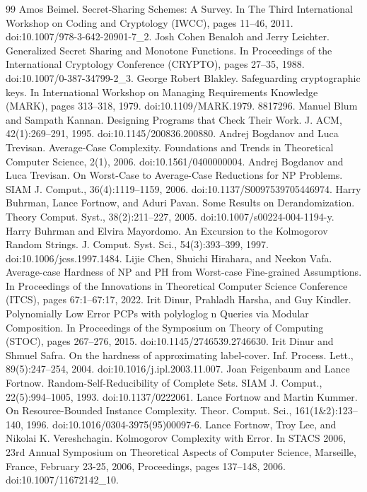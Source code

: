 \documentclass[10pt,a4paper]{article}
\begin{document}
\begin{thebibliography}{99}
 Amos Beimel. Secret-Sharing Schemes: A Survey. In The Third International Workshop on Coding and Cryptology (IWCC), pages 11–46, 2011. doi:10.1007/978-3-642-20901-7\_2.
 Josh Cohen Benaloh and Jerry Leichter. Generalized Secret Sharing and Monotone Functions. In Proceedings of the International Cryptology Conference (CRYPTO), pages 27–35, 1988. doi:10.1007/0-387-34799-2\_3.
 George Robert Blakley. Safeguarding cryptographic keys. In International Workshop on Managing Requirements Knowledge (MARK), pages 313–318, 1979. doi:10.1109/MARK.1979. 8817296.
 Manuel Blum and Sampath Kannan. Designing Programs that Check Their Work. J. ACM, 42(1):269–291, 1995. doi:10.1145/200836.200880.
 Andrej Bogdanov and Luca Trevisan. Average-Case Complexity. Foundations and Trends in Theoretical Computer Science, 2(1), 2006. doi:10.1561/0400000004.
 Andrej Bogdanov and Luca Trevisan. On Worst-Case to Average-Case Reductions for NP Problems. SIAM J. Comput., 36(4):1119–1159, 2006. doi:10.1137/S0097539705446974.
 Harry Buhrman, Lance Fortnow, and Aduri Pavan. Some Results on Derandomization. Theory Comput. Syst., 38(2):211–227, 2005. doi:10.1007/s00224-004-1194-y.
 Harry Buhrman and Elvira Mayordomo. An Excursion to the Kolmogorov Random Strings. J. Comput. Syst. Sci., 54(3):393–399, 1997. doi:10.1006/jcss.1997.1484.
 Lijie Chen, Shuichi Hirahara, and Neekon Vafa. Average-case Hardness of NP and PH from Worst-case Fine-grained Assumptions. In Proceedings of the Innovations in Theoretical Computer Science Conference (ITCS), pages 67:1–67:17, 2022.
 Irit Dinur, Prahladh Harsha, and Guy Kindler. Polynomially Low Error PCPs with polyloglog n Queries via Modular Composition. In Proceedings of the Symposium on Theory of Computing (STOC), pages 267–276, 2015. doi:10.1145/2746539.2746630.
 Irit Dinur and Shmuel Safra. On the hardness of approximating label-cover. Inf. Process. Lett., 89(5):247–254, 2004. doi:10.1016/j.ipl.2003.11.007.
 Joan Feigenbaum and Lance Fortnow. Random-Self-Reducibility of Complete Sets. SIAM J. Comput., 22(5):994–1005, 1993. doi:10.1137/0222061.
 Lance Fortnow and Martin Kummer. On Resource-Bounded Instance Complexity. Theor. Comput. Sci., 161(1\&2):123–140, 1996. doi:10.1016/0304-3975(95)00097-6.
 Lance Fortnow, Troy Lee, and Nikolai K. Vereshchagin. Kolmogorov Complexity with Error. In STACS 2006, 23rd Annual Symposium on Theoretical Aspects of Computer Science, Marseille, France, February 23-25, 2006, Proceedings, pages 137–148, 2006. doi:10.1007/11672142\_10.

\end{thebibliography}
\end{document}
